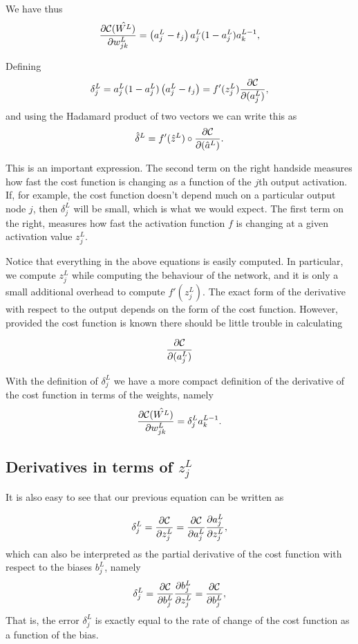 \documentclass[%
oneside,                 %
final,                   %
10pt]{article}
\begin{document}
We have thus
\[
\frac{\partial{\cal C}(\hat{W^L})}{\partial w_{jk}^L}  =  \left(a_j^L - t_j\right)a_j^L(1-a_j^L)a_k^{L-1}, 
\]

Defining
\[
\delta_j^L = a_j^L(1-a_j^L)\left(a_j^L - t_j\right) = f'(z_j^L)\frac{\partial {\cal C}}{\partial (a_j^L)},
\]
and using the Hadamard product of two vectors we can write this as
\[
\hat{\delta}^L = f'(\hat{z}^L)\circ\frac{\partial {\cal C}}{\partial (\hat{a}^L)}.
\]

This is an important expression. The second term on the right handside
measures how fast the cost function is changing as a function of the $j$th
output activation.  If, for example, the cost function doesn't depend
much on a particular output node $j$, then $\delta_j^L$ will be small,
which is what we would expect. The first term on the right, measures
how fast the activation function $f$ is changing at a given activation
value $z_j^L$.

Notice that everything in the above equations is easily computed.  In
particular, we compute $z_j^L$ while computing the behaviour of the
network, and it is only a small additional overhead to compute
$f'(z^L_j)$.  The exact form of the derivative with respect to the
output depends on the form of the cost function.
However, provided the cost function is known there should be little
trouble in calculating

\[
\frac{\partial {\cal C}}{\partial (a_j^L)}
\]

With the definition of $\delta_j^L$ we have a more compact definition of the derivative of the cost function in terms of the weights, namely
\[
\frac{\partial{\cal C}(\hat{W^L})}{\partial w_{jk}^L}  =  \delta_j^La_k^{L-1}.
\]

\subsection{Derivatives in terms of $z_j^L$}

It is also easy to see that our previous equation can be written as

\[
\delta_j^L =\frac{\partial {\cal C}}{\partial z_j^L}= \frac{\partial {\cal C}}{\partial a_j^L}\frac{\partial a_j^L}{\partial z_j^L},
\]
which can also be interpreted as the partial derivative of the cost function with respect to the biases $b_j^L$, namely
\[
\delta_j^L = \frac{\partial {\cal C}}{\partial b_j^L}\frac{\partial b_j^L}{\partial z_j^L}=\frac{\partial {\cal C}}{\partial b_j^L},
\]
That is, the error $\delta_j^L$ is exactly equal to the rate of change of the cost function as a function of the bias. 
\end{document}
